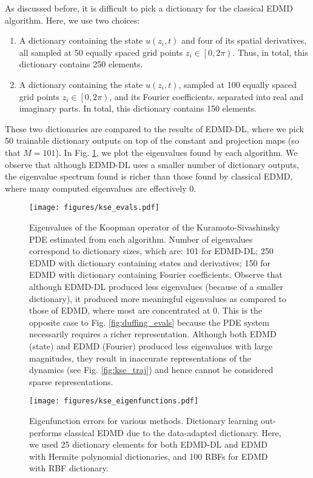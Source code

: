 \documentclass[%
 aip,
 cha,
 sd,%
 amsmath,amssymb,
 preprint,%
]{revtex4-1}
\begin{document}
As discussed before, it is difficult to pick a dictionary for the classical EDMD algorithm. Here, we use two choices:
\begin{enumerate}
	\item A dictionary containing the state $u(z_i,t)$ and four of its spatial derivatives, all sampled at 50 equally spaced grid points $z_i\in\left[0,2\pi\right)$. Thus, in total, this dictionary contains 250 elements.
	\item A dictionary containing the state $u(z_i,t)$, sampled at 100 equally spaced grid points $z_i\in\left[0,2\pi\right)$, and its Fourier coefficients, separated into real and imaginary parts. In total, this dictionary contains 150 elements.
\end{enumerate}
These two dictionaries are compared to the results of EDMD-DL, where we pick 50 trainable dictionary outputs on top of the constant and projection maps (so that $M=101$). In Fig. \ref{fig:kse_evals}, we plot the eigenvalues found by each algorithm. We observe that although EDMD-DL uses a smaller number of dictionary outputs, the eigenvalue spectrum found is richer than those found by classical EDMD, where many computed eigenvalues are effectively $0$. 
\begin{figure}
	\begin{center}
		\texttt{[image: figures/kse\_evals.pdf]}
	\end{center}
	\caption{Eigenvalues of the Koopman operator of the Kuramoto-Sivashinsky PDE estimated from each algorithm. Number of eigenvalues correspond to dictionary sizes, which are: 101 for EDMD-DL; 250 EDMD with dictionary containing states and derivatives; 150 for EDMD with dictionary containing Fourier coefficients. Observe that although EDMD-DL produced less eigenvalues (because of a smaller dictionary), it produced more meaningful eigenvalues as compared to those of EDMD, where most are concentrated at 0. This is the opposite case to Fig. \ref{fig:duffing_evals} because the PDE system necessarily requires a richer representation. Although both EDMD (state) and EDMD (Fourier) produced less eigenvalues with large magnitudes, they result in inaccurate representations of the dynamics (see Fig. \ref{fig:kse_traj}) and hence cannot be considered sparse representations. }
	\label{fig:kse_evals}
\end{figure}
\begin{figure}
	\begin{center}
		\texttt{[image: figures/kse\_eigenfunctions.pdf]}
	\end{center}
	\caption{Eigenfunction errors for various methods. Dictionary learning out-performs classical EDMD due to the data-adapted dictionary. Here, we used 25 dictionary elements for both EDMD-DL and EDMD with Hermite polynomial dictionaries, and 100 RBFs for EDMD with RBF dictionary.}
	\label{fig:kse_efuns}
\end{figure}
\end{document}
